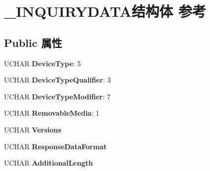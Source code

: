 \hypertarget{struct___i_n_q_u_i_r_y_d_a_t_a}{}\section{\+\_\+\+I\+N\+Q\+U\+I\+R\+Y\+D\+A\+T\+A结构体 参考}
\label{struct___i_n_q_u_i_r_y_d_a_t_a}
\subsection*{Public 属性}
\begin{DoxyCompactItemize}
\item 
\mbox{\label{struct___i_n_q_u_i_r_y_d_a_t_a_ad34d58236ab79bef717d60960ab99e9e}} 
U\+C\+H\+AR {\bfseries Device\+Type}\+: 5
\item 
\mbox{\label{struct___i_n_q_u_i_r_y_d_a_t_a_ae19bc649fc048bb6b655a6773c4a68f1}} 
U\+C\+H\+AR {\bfseries Device\+Type\+Qualifier}\+: 3
\item 
\mbox{\label{struct___i_n_q_u_i_r_y_d_a_t_a_a641cb312c14b9f61e2a41a2308bd53ff}} 
U\+C\+H\+AR {\bfseries Device\+Type\+Modifier}\+: 7
\item 
\mbox{\label{struct___i_n_q_u_i_r_y_d_a_t_a_a2f3d5d8478456251f2215fa371d3d497}} 
U\+C\+H\+AR {\bfseries Removable\+Media}\+: 1
\item 
\mbox{\label{struct___i_n_q_u_i_r_y_d_a_t_a_a026849a70134f863ca45d23b620d266e}} 
U\+C\+H\+AR {\bfseries Versions}
\item 
\mbox{\label{struct___i_n_q_u_i_r_y_d_a_t_a_ac8c72b6aadd8e0824693ea099dcc9b36}} 
U\+C\+H\+AR {\bfseries Response\+Data\+Format}
\item 
\mbox{\label{struct___i_n_q_u_i_r_y_d_a_t_a_af963dc6f1e13a24ccec05b3fdf15be2b}} 
U\+C\+H\+AR {\bfseries Additional\+Length}
\item 
\mbox{\label{struct___i_n_q_u_i_r_y_d_a_t_a_acc973ff7b7e6f6ac1bad4016f81f4742}} 

\end{DoxyCompactItemize}
